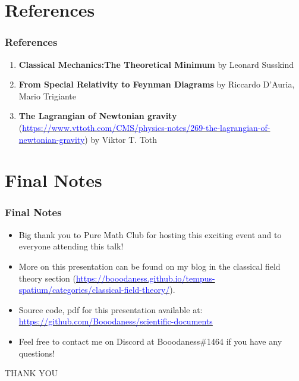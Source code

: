 \documentclass{beamer}
\begin{document}
\section{References}

\begin{frame}
\frametitle{References}

\begin{enumerate}
\item \textbf{Classical Mechanics:The Theoretical Minimum} by Leonard Susskind

\item \textbf{From Special Relativity to Feynman Diagrams} by Riccardo D'Auria, Mario Trigiante

\item \textbf{The Lagrangian of Newtonian gravity} (\href{https://www.vttoth.com/CMS/physics-notes/269-the-lagrangian-of-newtonian-gravity}{\textcolor{blue}{https://www.vttoth.com/CMS/physics-notes/269-the-lagrangian-of-newtonian-gravity}}) by Viktor T. Toth
\end{enumerate}
\end{frame}

\section{Final Notes}

\begin{frame}
\frametitle{Final Notes}

\begin{itemize}
\item Big thank you to Pure Math Club for hosting this exciting event and to everyone attending this talk!

\item More on this presentation can be found on my blog in the classical field theory section (\href{https://booodaness.github.io/tempus-spatium/categories/classical-field-theory/}{\textcolor{blue}{https://booodaness.github.io/tempus-spatium/categories/classical-field-theory/}}).

\item Source code, pdf for this presentation available at: \href{https://github.com/Booodaness/scientific-documents/tree/master/applying_klein_gordon_theory_gravitation}{\textcolor{blue}{https://github.com/Booodaness/scientific-documents}}

\item Feel free to contact me on Discord at Booodaness\#1464 if you have any questions!
\end{itemize}
\end{frame}

\begin{frame}
\begin{center}
\Huge \textcolor{blue!50!gray}{THANK YOU}
\end{center}
\end{frame}
\end{document}
